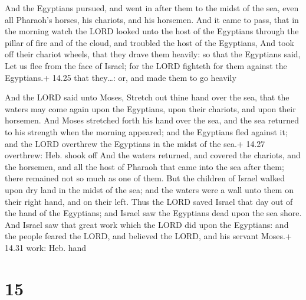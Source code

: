  And the Egyptians pursued, and went in after them to the
midst of the sea, even all Pharaoh's horses, his chariots, and his
horsemen.  And it came to pass, that in the morning watch
the LORD looked unto the host of the Egyptians through the pillar of
fire and of the cloud, and troubled the host of the Egyptians,
 And took off their chariot wheels, that they drave them
heavily: so that the Egyptians said, Let us flee from the face of
Israel; for the LORD fighteth for them against the Egyptians.+ 14.25
that they\ldots: or, and made them to go heavily

 And the LORD said unto Moses, Stretch out thine hand
over the sea, that the waters may come again upon the Egyptians, upon
their chariots, and upon their horsemen.  And Moses
stretched forth his hand over the sea, and the sea returned to his
strength when the morning appeared; and the Egyptians fled against it;
and the LORD overthrew the Egyptians in the midst of the sea.+ 14.27
overthrew: Heb. shook off  And the waters returned, and
covered the chariots, and the horsemen, and all the host of Pharaoh that
came into the sea after them; there remained not so much as one of them.
 But the children of Israel walked upon dry land in the
midst of the sea; and the waters were a wall unto them on their right
hand, and on their left.  Thus the LORD saved Israel that
day out of the hand of the Egyptians; and Israel saw the Egyptians dead
upon the sea shore.  And Israel saw that great work which
the LORD did upon the Egyptians: and the people feared the LORD, and
believed the LORD, and his servant Moses.+ 14.31 work: Heb. hand

\hypertarget{section-14}{%
\section{15}\label{section-14}}

